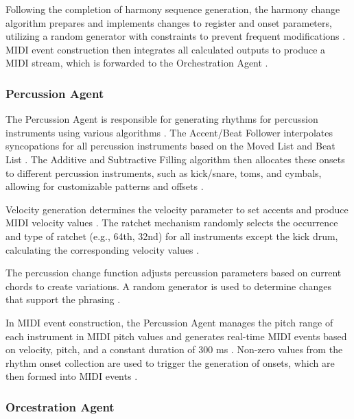Following the completion of harmony sequence generation, the harmony change algorithm prepares and implements changes to register and onset parameters, utilizing a random generator with constraints to prevent frequent modifications \cite{lopez2023progressive}. MIDI event construction then integrates all calculated outputs to produce a MIDI stream, which is forwarded to the Orchestration Agent \cite{lopez2023progressive}.


\subsubsection{Percussion Agent}

The Percussion Agent is responsible for generating rhythms for percussion instruments using various algorithms \cite{lopez2023progressive}. The Accent/Beat Follower interpolates syncopations for all percussion instruments based on the Moved List and Beat List \cite{lopez2023progressive}. The Additive and Subtractive Filling algorithm then allocates these onsets to different percussion instruments, such as kick/snare, toms, and cymbals, allowing for customizable patterns and offsets \cite{lopez2023progressive}.

Velocity generation determines the velocity parameter to set accents and produce MIDI velocity values \cite{lopez2023progressive}. The ratchet mechanism randomly selects the occurrence and type of ratchet (e.g., 64th, 32nd) for all instruments except the kick drum, calculating the corresponding velocity values \cite{lopez2023progressive}.

The percussion change function adjusts percussion parameters based on current chords to create variations. A random generator is used to determine changes that support the phrasing \cite{lopez2023progressive}.

In MIDI event construction, the Percussion Agent manages the pitch range of each instrument in MIDI pitch values and generates real-time MIDI events based on velocity, pitch, and a constant duration of 300 ms \cite{lopez2023progressive}. Non-zero values from the rhythm onset collection are used to trigger the generation of onsets, which are then formed into MIDI events \cite{lopez2023progressive}.

\subsubsection{Orcestration Agent}

